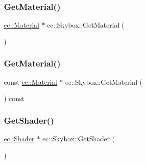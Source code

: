 \subsubsection{\texorpdfstring{Get\+Material()}{GetMaterial()}\hspace{0.1cm}{\footnotesize\ttfamily [1/2]}}
{\footnotesize\ttfamily \mbox{\hyperlink{classec_1_1_material}{ec\+::\+Material}} $\ast$ ec\+::\+Skybox\+::\+Get\+Material (\begin{DoxyParamCaption}{ }\end{DoxyParamCaption})}

\mbox{\label{classec_1_1_skybox_ae231b7b992340d901131fc65946fbd4e}} 
\subsubsection{\texorpdfstring{Get\+Material()}{GetMaterial()}\hspace{0.1cm}{\footnotesize\ttfamily [2/2]}}
{\footnotesize\ttfamily const \mbox{\hyperlink{classec_1_1_material}{ec\+::\+Material}} $\ast$ ec\+::\+Skybox\+::\+Get\+Material (\begin{DoxyParamCaption}{ }\end{DoxyParamCaption}) const}

\mbox{\label{classec_1_1_skybox_ab63b1a4a1f926e16f75cf071db9d2127}} 
\subsubsection{\texorpdfstring{Get\+Shader()}{GetShader()}\hspace{0.1cm}{\footnotesize\ttfamily [1/2]}}
{\footnotesize\ttfamily \mbox{\hyperlink{classec_1_1_shader}{ec\+::\+Shader}} $\ast$ ec\+::\+Skybox\+::\+Get\+Shader (\begin{DoxyParamCaption}{ }\end{DoxyParamCaption})}

\mbox{\label{classec_1_1_skybox_a4843db2aecab69cb7759edfbb25630d3}} 
